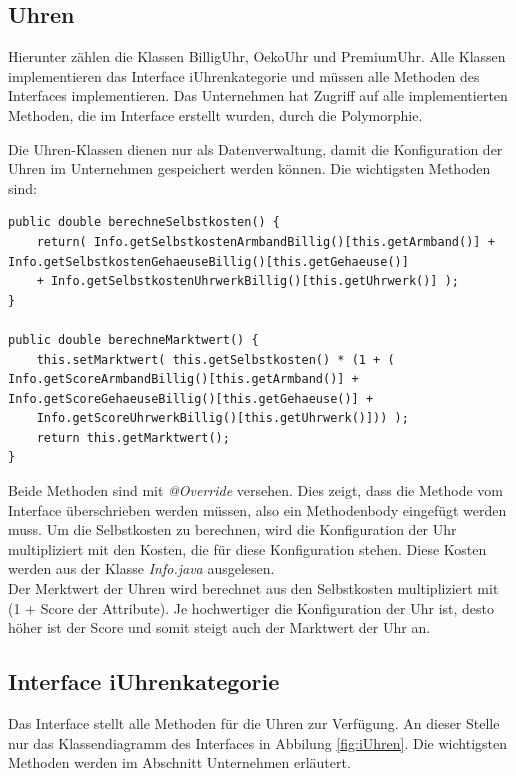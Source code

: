 \subsection{Uhren}
Hierunter zählen die Klassen BilligUhr, OekoUhr und PremiumUhr. Alle Klassen implementieren das Interface iUhrenkategorie und müssen alle Methoden des Interfaces implementieren. Das Unternehmen hat Zugriff auf alle implementierten Methoden, die im Interface erstellt wurden, durch die Polymorphie. 

Die Uhren-Klassen dienen nur als Datenverwaltung, damit die Konfiguration der Uhren im Unternehmen gespeichert werden können. Die wichtigsten Methoden sind: \\

\begin{lstlisting}
public double berechneSelbstkosten() {
	return( Info.getSelbstkostenArmbandBillig()[this.getArmband()] + Info.getSelbstkostenGehaeuseBillig()[this.getGehaeuse()] 
	+ Info.getSelbstkostenUhrwerkBillig()[this.getUhrwerk()] );
}

public double berechneMarktwert() {
	this.setMarktwert( this.getSelbstkosten() * (1 + ( Info.getScoreArmbandBillig()[this.getArmband()] + Info.getScoreGehaeuseBillig()[this.getGehaeuse()] + 
	Info.getScoreUhrwerkBillig()[this.getUhrwerk()])) ); 
	return this.getMarktwert();
}
\end{lstlisting}
Beide Methoden sind mit \textit{@Override} versehen. Dies zeigt, dass die Methode vom Interface überschrieben werden müssen, also ein Methodenbody eingefügt werden muss. Um die Selbstkosten zu berechnen, wird die Konfiguration der Uhr multipliziert mit den Kosten, die für diese Konfiguration stehen. Diese Kosten werden aus der Klasse \textit{Info.java} ausgelesen.\\

Der Merktwert der Uhren wird berechnet aus den Selbstkosten multipliziert mit (1 + Score der Attribute). Je hochwertiger die Konfiguration der Uhr ist, desto höher ist der Score und somit steigt auch der Marktwert der Uhr an.

\subsection{Interface iUhrenkategorie}
Das Interface stellt alle Methoden für die Uhren zur Verfügung. An dieser Stelle nur das Klassendiagramm des Interfaces in Abbilung \ref{fig:iUhren}. Die wichtigsten Methoden werden im Abschnitt Unternehmen erläutert.

